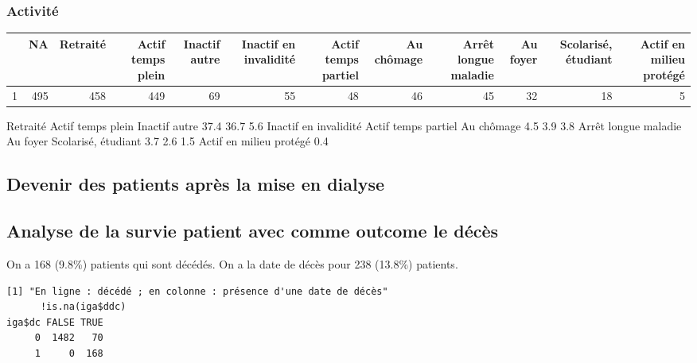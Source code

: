\documentclass[11pt,a4paper]{article}\usepackage[]{graphicx}\usepackage[]{color}
\makeatletter
\newenvironment{kframe}{%
 \def\at@end@of@kframe{}%
 \ifinner\ifhmode%
  \def\at@end@of@kframe{\end{minipage}}%
  \begin{minipage}{\columnwidth}%
 \fi\fi%
 \def\FrameCommand##1{\hskip\@totalleftmargin \hskip-\fboxsep
 \colorbox{shadecolor}{##1}\hskip-\fboxsep
     \hskip-\linewidth \hskip-\@totalleftmargin \hskip\columnwidth}%
 \MakeFramed {\advance\hsize-\width
   \@totalleftmargin\z@ \linewidth\hsize
   \@setminipage}}%
 {\par\unskip\endMakeFramed%
 \at@end@of@kframe}
\newenvironment{knitrout}{}{} %
\makeatother
\begin{document}
    \subsubsection{Activité}

\begin{table}[ht]
\centering
\begin{tabular}{rrrrrrrrrrrr}
  \hline
 & NA & Retraité & Actif temps plein & Inactif autre & Inactif en invalidité & Actif temps partiel & Au chômage & Arrêt longue maladie & Au foyer & Scolarisé, étudiant & Actif en milieu protégé \\ 
  \hline
1 & 495 & 458 & 449 &  69 &  55 &  48 &  46 &  45 &  32 &  18 &   5 \\ 
   \hline
\end{tabular}
\end{table}

               Retraité       Actif temps plein           Inactif autre 
                   37.4                    36.7                     5.6 
  Inactif en invalidité     Actif temps partiel              Au chômage 
                    4.5                     3.9                     3.8 
   Arrêt longue maladie                Au foyer     Scolarisé, étudiant 
                    3.7                     2.6                     1.5 
Actif en milieu protégé 
                    0.4 


  \subsection{Devenir des patients après la mise en dialyse}
  
  \subsection{Analyse de la survie patient avec comme outcome le décès}
  
  On a 168 (9.8\%) patients qui sont décédés. On a la date de décès pour 238 (13.8\%) patients.

\begin{knitrout}
\color{fgcolor}\begin{kframe}
\begin{verbatim}
[1] "En ligne : décédé ; en colonne : présence d'une date de décès"
      !is.na(iga$ddc)
iga$dc FALSE TRUE
     0  1482   70
     1     0  168
\end{verbatim}
\end{kframe}
\end{knitrout}
\end{document}
